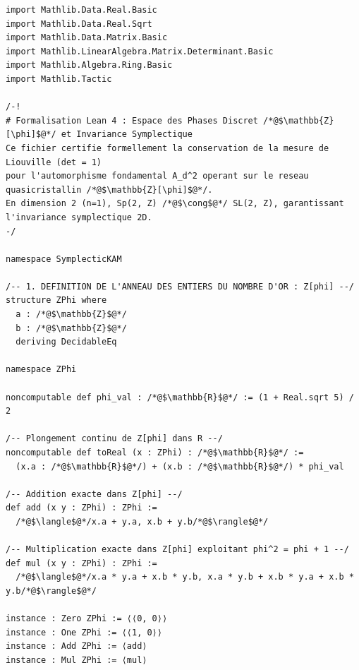 \documentclass[10pt,twocolumn,a4paper]{article}
\begin{document}
\begin{samepage}
\begin{lstlisting}[language=Lean4, caption={Code Lean 4 Certifié (Intégal 146 Lignes)}]
import Mathlib.Data.Real.Basic
import Mathlib.Data.Real.Sqrt
import Mathlib.Data.Matrix.Basic
import Mathlib.LinearAlgebra.Matrix.Determinant.Basic
import Mathlib.Algebra.Ring.Basic
import Mathlib.Tactic

/-!
# Formalisation Lean 4 : Espace des Phases Discret /*@$\mathbb{Z}[\phi]$@*/ et Invariance Symplectique
Ce fichier certifie formellement la conservation de la mesure de Liouville (det = 1)
pour l'automorphisme fondamental A_d^2 operant sur le reseau quasicristallin /*@$\mathbb{Z}[\phi]$@*/.
En dimension 2 (n=1), Sp(2, Z) /*@$\cong$@*/ SL(2, Z), garantissant l'invariance symplectique 2D.
-/

namespace SymplecticKAM

/-- 1. DEFINITION DE L'ANNEAU DES ENTIERS DU NOMBRE D'OR : Z[phi] --/
structure ZPhi where
  a : /*@$\mathbb{Z}$@*/
  b : /*@$\mathbb{Z}$@*/
  deriving DecidableEq

namespace ZPhi

noncomputable def phi_val : /*@$\mathbb{R}$@*/ := (1 + Real.sqrt 5) / 2

/-- Plongement continu de Z[phi] dans R --/
noncomputable def toReal (x : ZPhi) : /*@$\mathbb{R}$@*/ :=
  (x.a : /*@$\mathbb{R}$@*/) + (x.b : /*@$\mathbb{R}$@*/) * phi_val

/-- Addition exacte dans Z[phi] --/
def add (x y : ZPhi) : ZPhi :=
  /*@$\langle$@*/x.a + y.a, x.b + y.b/*@$\rangle$@*/

/-- Multiplication exacte dans Z[phi] exploitant phi^2 = phi + 1 --/
def mul (x y : ZPhi) : ZPhi :=
  /*@$\langle$@*/x.a * y.a + x.b * y.b, x.a * y.b + x.b * y.a + x.b * y.b/*@$\rangle$@*/

instance : Zero ZPhi := ⟨⟨0, 0⟩⟩
instance : One ZPhi := ⟨⟨1, 0⟩⟩
instance : Add ZPhi := ⟨add⟩
instance : Mul ZPhi := ⟨mul⟩


\end{lstlisting}
\end{samepage}
\end{document}
